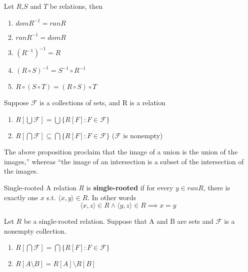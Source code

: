 \begin{proposition}{}{}
    Let $R$,$S$ and $T$ be relations, then
    \begin{enumerate}

        \item $dom R^{-1} = ran R$
        \item $ran R^{-1} = dom R$
        \item $(R^{-1})^{-1} = R$
        \item $(R \circ S)^{-1} = S^{-1} \circ R^{-1}$
        \item $R \circ (S \circ T) = (R \circ S) \circ T$

    \end{enumerate}
\end{proposition}

\begin{proposition}{}{}
    Suppose $\mathcal{F}$ is a collections of sets, and R is a relation
    \begin{enumerate}

        \item $R[\bigcup \mathcal{F}] = \bigcup \{R[F] : F \in \mathcal{F}\}$
        \item $R[\bigcap \mathcal{F}] \subseteq \bigcap \{R[F] : F \in
            \mathcal{F}\}$ ($\mathcal{F}$ is nonempty)

    \end{enumerate}
\end{proposition}
The above proposition proclaim that the image of a union is the union
of the images,” whereas “the image of an intersection is a subset of
the intersection of the images.

\begin{definition}{Single-rooted}{}
    A relation $R$ is \textbf{single-rooted} if for every $y \in ran
    R$, there is exactly one $x$ s.t. $\langle x,y \rangle \in R$. In
    other words
    \begin{equation*}
        \langle x,z \rangle \in R \land \langle y,z \rangle \in R \implies x = y
    \end{equation*}
\end{definition}

\begin{corollary}{}{}
    Let $R$ be a single-rooted relation. Suppose that A and B are sets
    and $\mathcal{F}$ is a nonempty collection.
    \begin{enumerate}

        \item $R[\bigcap \mathcal{F}] = \bigcap \{R[F] : F \in \mathcal{F}\}$
        \item $R[A \setminus B] = R[A] \setminus R[B]$

    \end{enumerate}
\end{corollary}

